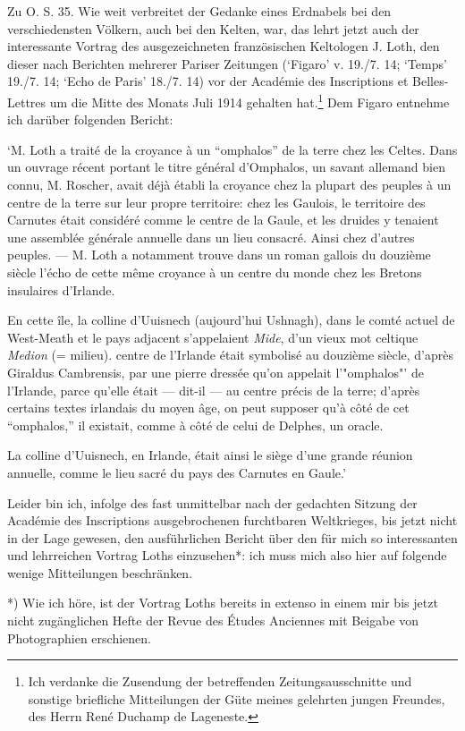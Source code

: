 \documentclass[a4paper, 11pt, oneside]{article}
\begin{document}
Zu O. S. 35. Wie weit verbreitet der Gedanke eines Erdnabels bei den verschiedensten Völkern, auch bei den Kelten, war, das lehrt jetzt auch der interessante Vortrag des ausgezeichneten französischen Keltologen J. Loth, den dieser nach Berichten mehrerer Pariser Zeitungen (`Figaro' v. 19./7. 14; `Temps' 19./7. 14; `Echo de Paris' 18./7. 14) vor der Académie des Inscriptions et Belles-Lettres um die Mitte des Monats Juli 1914 gehalten hat.\footnote{Ich verdanke die Zusendung der betreffenden Zeitungsausschnitte und sonstige briefliche Mitteilungen der Güte meines gelehrten jungen Freundes, des Herrn René Duchamp de Lageneste.} Dem Figaro entnehme ich darüber folgenden Bericht:

`M. Loth a traité de la croyance à un "`omphalos"' de la terre chez les Celtes. Dans un ouvrage récent portant le titre général d'Omphalos, un savant allemand bien connu, M. Roscher, avait déjà établi la croyance chez la plupart des peuples à un centre de la terre sur leur propre territoire: chez les Gaulois, le territoire des Carnutes était considéré comme le centre de la Gaule, et les druides y tenaient une assemblée générale annuelle dans un lieu consacré. Ainsi chez d'autres peuples. --- M. Loth a notamment trouve dans un roman gallois du douzième siècle l'écho de cette même croyance à un centre du monde chez les Bretons insulaires d'Irlande.

En cette île, la colline d'Uuisnech (aujourd'hui Ushnagh), dans le comté actuel de West-Meath et le pays adjacent s'appelaient \emph{Mide}, d'un vieux mot celtique \emph{Medion} (= milieu). centre de l'Irlande était symbolisé au douzième siècle, d'après Giraldus Cambrensis, par une pierre dressée qu'on appelait l'"omphalos"' de l'Irlande, parce qu'elle était --- dit-il --- au centre précis de la terre; d'après certains textes irlandais du moyen âge, on peut supposer qu'à côté de cet "`omphalos,"' il existait, comme à côté de celui de Delphes, un oracle.

La colline d'Uuisnech, en Irlande, était ainsi le siège d'une grande réunion annuelle, comme le lieu sacré du pays des Carnutes en Gaule.'

Leider bin ich, infolge des fast unmittelbar nach der gedachten Sitzung der Académie des Inscriptions ausgebrochenen furchtbaren Weltkrieges, bis jetzt nicht in der Lage gewesen, den ausführlichen Bericht über den für mich so interessanten und lehrreichen Vortrag Loths einzusehen*: ich muss mich also hier auf folgende wenige Mitteilungen beschränken.

*) Wie ich höre, ist der Vortrag Loths bereits in extenso in einem mir bis jetzt nicht zugänglichen Hefte der Revue des Études Anciennes mit Beigabe von Photographien erschienen.
\end{document}

